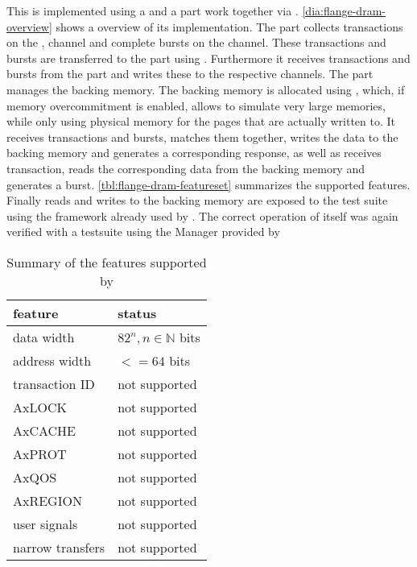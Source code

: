 This is implemented using a \systemverilog{} and a \cpp{} part work together via \DPI{}. \autoref{dia:flange-dram-overview} shows a overview of its implementation. The \systemverilog{} part collects transactions on the \AW{}, \AR{} \AXI{} channel and complete bursts on the \W{} \AXI{} channel. These transactions and bursts are transferred to the \cpp{} part using \DPI{}. Furthermore it receives \B{} transactions and \R{} bursts from the \cpp{} part and writes these to the respective \AXI{} channels.
The \cpp{} part manages the backing memory. The backing memory is allocated using \mmap{}, which, if memory overcommitment is enabled, allows to simulate very large memories, while only using physical memory for the pages that are actually written to. It receives \AW{} transactions and \W{} bursts, matches them together, writes the data to the backing memory and generates a corresponding \B{} response, as well as receives \AR{} transaction, reads the corresponding data from the backing memory and generates a \R{} burst. \autoref{tbl:flange-dram-featureset} summarizes the supported \AXI{} features. Finally reads and writes to the backing memory are exposed to the test suite using the \RCF{} framework already used by \flange{}.
The correct operation of \flangedram{} itself was again verified with a testsuite using the \AXI{} Manager provided by \cocotb{}

\begin{table}
  \begin{center}
\begin{tabular}{ll}
  \toprule
  feature & status \\
  \midrule
  data width & $8 2^{n}, n ∈ ℕ$ bits \\
  address width & $<= 64$ bits \\
  transaction ID & not supported \\
  AxLOCK & not supported \\
  AxCACHE & not supported \\
  AxPROT & not supported \\
  AxQOS & not supported \\
  AxREGION & not supported \\
  user signals & not supported \\
  narrow transfers & not supported \\
  \bottomrule
\end{tabular}
  \end{center}
\caption{Summary of the \AXI{} features supported by \flangedram}\label{tbl:flange-dram-featureset}
\end{table}

